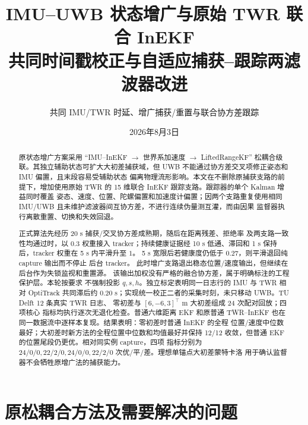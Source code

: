 \documentclass[11pt,a4paper]{ctexart}
\title{IMU--UWB 状态增广与原始 TWR 联合 InEKF\\
共同时间戳校正与自适应捕获--跟踪两滤波器改进}
\author{共同 IMU/TWR 时延、增广捕获/重置与联合协方差跟踪}
\date{2026年8月3日}
\begin{document}
\pagestyle{plain}
\maketitle

\begin{abstract}
原状态增广方案采用
``IMU--InEKF $\rightarrow$ 世界系加速度 $\rightarrow$
LiftedRangeKF'' 松耦合级联。其独立辅助状态可扩大大初差捕获域，但
UWB 不能通过协方差交叉项修正姿态和 IMU 偏置，且末段容易受辅助状态
偏离物理流形影响。本文在不删除原捕获支路的前提下，增加使用原始 TWR
的 15 维联合 InEKF 跟踪支路。跟踪器的单个 Kalman 增益同时覆盖
姿态、速度、位置、陀螺偏置和加速度计偏置；因两个支路重复使用相同
IMU/UWB 且未维护滤波器间互协方差，不进行连续伪量测互灌，而由因果
监督器执行离散重置、切换和失效回退。

正式算法先经历 20 s 捕获/交叉协方差成熟期，随后在距离残差、拒绝率
及两支路一致性均通过时，以 $0.3$ 权重接入 tracker；持续健康证据经
10 s 低通、滞回和 1 s 保持后，tracker 权重在 5 s 内平滑升至 $1$。
5 s 宽限后若健康度仍低于 $0.27$，则平滑退回纯 capture 输出而不停止
后台 tracker。
此时增广支路退出稳态位置/速度输出，但继续在后台作为失锁监视和重置源。
该输出加权没有严格的融合协方差，属于明确标注的工程保护层。本轮按要求
不强制投影 $q,s,h$。独立标定表明同一日志行的 IMU 与 TWR 相对
OptiTrack 共同滞后约 $0.20$ s；实现统一校正二者的采集时刻，未只移动
UWB。TU Delft 12 条真实 TWR 日志、
零初差与 $[6,-6,3]^\top$ m 大初差组成 24 次配对回放；四项核心
指标均执行逐次无退化检查。普通六维距离 EKF 和原普通 TWR--InEKF
也在同一数据流中逐样本复现。结果表明：零初差时普通 InEKF 的全程
位置/速度中位数最好；大初差时新方法的全程位置中位数和均值最好并保持
12/12 收敛，但普通 EKF 的位置尾段仍更优。相对同实例 capture，四项
指标分别为 $24/0/0,22/2/0,24/0/0,22/2/0$ 次优/平/差。理想单锚点大初差蒙特卡洛
用于确认监督器不会牺牲原增广法的捕获能力。
\end{abstract}

\section{原松耦合方法及需要解决的问题}
\end{document}
